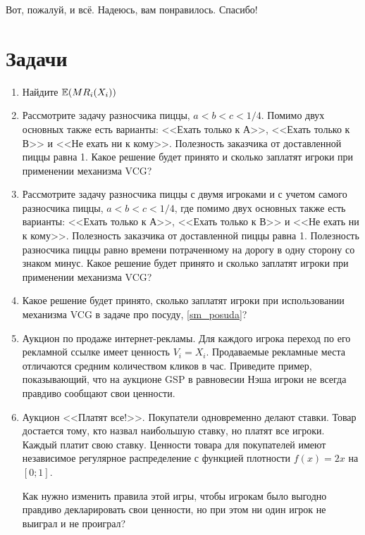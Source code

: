 Вот, пожалуй, и всё. Надеюсь, вам понравилось. Спасибо!



\section{Задачи}

\begin{enumerate}
\item Найдите $ \mathbb{E}(MR_{i}(X_{i})) $

\item Рассмотрите задачу разносчика пиццы, $ a<b<c<1/4 $. Помимо двух основных также есть варианты: <<Ехать только к А>>, <<Ехать только к В>> и <<Не ехать ни к кому>>. Полезность заказчика от доставленной пиццы равна 1. Какое решение будет принято и сколько заплатят игроки при применении механизма VCG?

\item Рассмотрите задачу разносчика пиццы с двумя игроками и с учетом самого разносчика пиццы, $ a<b<c<1/4 $, где помимо двух основных также есть варианты: <<Ехать только к А>>, <<Ехать только к В>> и <<Не ехать ни к кому>>. Полезность заказчика от доставленной пиццы равна 1. Полезность разносчика пиццы равно времени потраченному на дорогу в одну сторону со знаком минус. Какое решение будет принято и сколько заплатят игроки при применении механизма VCG?

\item Какое решение будет принято, сколько заплатят игроки при использовании механизма VCG в задаче про посуду, \ref{sm_posuda}?

\item Аукцион по продаже интернет-рекламы. Для каждого игрока переход по его рекламной ссылке имеет ценность $ V_{i}=X_{i} $. Продаваемые рекламные места отличаются средним количеством кликов в час. Приведите пример, показывающий, что на аукционе GSP в равновесии Нэша игроки не всегда правдиво сообщают свои ценности.

\item Аукцион <<Платят все!>>. Покупатели одновременно делают ставки. Товар достается
тому, кто назвал наибольшую ставку, но платят все игроки. Каждый платит свою
ставку. Ценности товара для покупателей имеют независимое регулярное распределение с функцией плотности $ f(x)=2x $ на $ [0;1] $.

Как нужно изменить правила этой игры, чтобы игрокам было выгодно правдиво декларировать свои ценности, но при этом ни один игрок не выиграл и не проиграл?


\end{enumerate}
